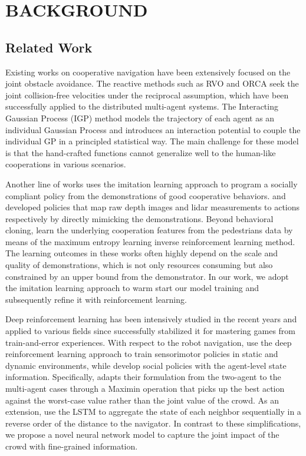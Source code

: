 \documentclass[letterpaper, 10 pt, conference]{ieeeconf}  %
\begin{document}
\section{BACKGROUND} \label{sec:background} 

\subsection{Related Work}

Existing works on cooperative navigation have been extensively focused on the joint obstacle avoidance. The reactive methods such as RVO \cite{berg_reciprocal_2008} and ORCA \cite{van_den_berg_reciprocal_2011} seek the joint collision-free velocities under the reciprocal assumption, which have been successfully applied to the distributed multi-agent systems. The Interacting Gaussian Process (IGP) method models the trajectory of each agent as an individual Gaussian Process and introduces an interaction potential to couple the individual GP in a principled statistical way. The main challenge for these model is that the hand-crafted functions cannot generalize well to the human-like cooperations in various scenarios. 

Another line of works uses the imitation learning approach to program a socially compliant policy from the demonstrations of good cooperative behaviors. \cite{tai_socially_2017} and \cite{long_deep-learned_2017} developed policies that map raw depth images and lidar measurements to actions respectively by directly mimicking the demonstrations. Beyond behavioral cloning, \cite{roy_feature-based_2013, kretzschmar_socially_2016, pfeiffer_predicting_2016} learn the underlying cooperation features from the pedestrians data by means of the maximum entropy learning inverse reinforcement learning method. The learning outcomes in these works often highly depend on the scale and quality of demonstrations, which is not only resources consuming but also constrained by an upper bound from the demonstrator. In our work, we adopt the imitation learning approach to warm start our model training and subsequently refine it with reinforcement learning. 

Deep reinforcement learning has been intensively studied in the recent years and applied to various fields since \cite{mnih_human-level_2015} successfully stabilized it for mastering games from train-and-error experiences. With respect to the robot navigation, \cite{tai_virtual--real_2017,long_towards_2017} use the deep reinforcement learning approach to train sensorimotor policies in static and dynamic environments, while \cite{chen_decentralized_2016,chen_socially_2017,everett_motion_2018} develop social policies with the agent-level state information. Specifically, \cite{chen_decentralized_2016} adapts their formulation from the two-agent to the multi-agent cases through a Maximin operation that picks up the best action against the worst-case value rather than the joint value of the crowd. As an extension, \cite{everett_motion_2018} use the LSTM to aggregate the state of each neighbor sequentially in a reverse order of the distance to the navigator. In contrast to these simplifications, we propose a novel neural network model to capture the joint impact of the crowd with fine-grained information. 
\end{document}
